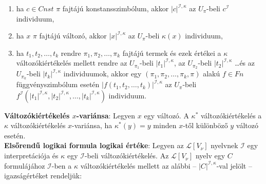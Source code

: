 \documentclass[tikz,12pt,margin=0px]{article}
\begin{document}
 	\begin{enumerate}
 		\item ha $c \in Cnst$ $\pi$ fajtájú konstansszimbólum, akkor $|c|^{\mathcal{I},\kappa}$ az $U_{\pi}$-beli $c^{\mathcal{I}}$ individuum,
 		
 		\item ha $x$ $\pi$ fajtájú változó, akkor $|x|^{\mathcal{I},\kappa}$ az $U_{\pi}$-beli $\kappa(x)$ individuum,
        \item ha $t_{1}, t_{2}, \ldots, t_{k}$ rendre $\pi_{1}, \pi_{2}, \ldots, \pi_{k}$ fajtájú termek és ezek értékei a $\kappa$ változókiértékelés mellett rendre az $U_{\pi_{1}}$-beli $|t_{1}|^{\mathcal{I},\kappa}$, az $U_{\pi_{2}}$-beli $|t_{2}|^{\mathcal{I},\kappa}$ \ldots és az $U_{\pi_{k}}$-beli $|t_{k}|^{\mathcal{I},\kappa}$ individuumok, akkor egy $(\pi_{1}, \pi_{2}, \ldots, \pi_{k}, \pi)$ alakú $f \in Fn$ függvényszimbólum esetén $|f(t_{1}, t_{2}, \ldots, t_{k})|^{\mathcal{I},\kappa}$ az $U_{\pi}$-beli
 		$f^{\mathcal{I}}(|t_{1}|^{\mathcal{I},\kappa}, |t_{2}|^{\mathcal{I},\kappa}, \ldots, |t_{k}|^{\mathcal{I},\kappa})$ individuum.
    \end{enumerate}
 	
    \noindent \textbf{Változókiértékelés $x$-variánsa}: Legyen $x$ egy változó. A $\kappa^{*}$ változókiértékelés a $\kappa$ változókiértékelés $x$-variánsa, ha $\kappa^{*}(y) = y$ minden $x$-től különböző $y$ változó esetén.\\
 	
 	\noindent \textbf{Elsőrendű logikai formula logikai értéke}:
    Legyen az $\mathcal{L}[V_{\nu}]$ nyelvnek $\mathcal{I}$ egy interpretációja és $\kappa$ egy $\mathcal{I}$-beli változókiértékelés. Az $\mathcal{L}[V_{\nu}]$ nyelv egy $C$ formulájához $\mathcal{I}$-ben a $\kappa$ változókiértékelés mellett az alábbi -- $|C|^{\mathcal{I},\kappa}$-val jelölt -- igazságértéket rendeljük:
 	
\end{document}
